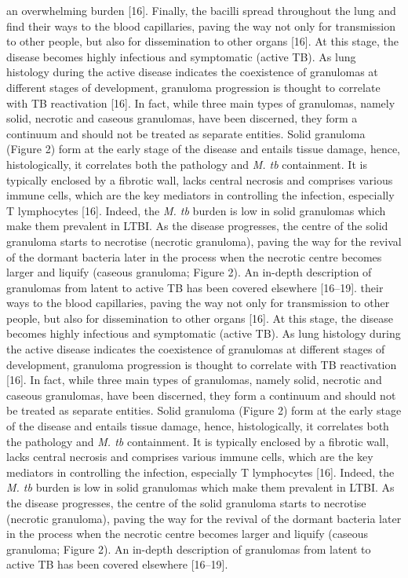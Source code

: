 \documentclass{article}
\begin{document}
an overwhelming burden [16]. Finally, the bacilli spread throughout the lung and find their ways to the blood capillaries, paving the way not only for transmission to other people, but also for dissemination to other organs [16]. At this stage, the disease becomes highly infectious and symptomatic (active TB). As lung histology during the active disease indicates the coexistence of granulomas at different stages of development, granuloma progression is thought to correlate with TB reactivation [16]. In fact, while three main types of granulomas, namely solid, necrotic and caseous granulomas, have been discerned, they form a continuum and should not be treated as separate entities. Solid granuloma (Figure 2) form at the early stage of the disease and entails tissue damage, hence, histologically, it correlates both the pathology and \textit{M. tb} containment. It is typically enclosed by a fibrotic wall, lacks central necrosis and comprises various immune cells, which are the key mediators in controlling the infection, especially T lymphocytes [16]. Indeed, the \textit{M. tb} burden is low in solid granulomas which make them prevalent in LTBI. As the disease progresses, the centre of the solid granuloma starts to necrotise (necrotic granuloma), paving the way for the revival of the dormant bacteria later in the process when the necrotic centre becomes larger and liquify (caseous granuloma; Figure 2). An in-depth description of granulomas from latent to active TB has been covered elsewhere [16–19]. their ways to the blood capillaries, paving the way not only for transmission to other people, but also for dissemination to other organs [16]. At this stage, the disease becomes highly infectious and symptomatic (active TB). As lung histology during the active disease indicates the coexistence of granulomas at different stages of development, granuloma progression is thought to correlate with TB reactivation [16]. In fact, while three main types of granulomas, namely solid, necrotic and caseous granulomas, have been discerned, they form a continuum and should not be treated as separate entities. Solid granuloma (Figure 2) form at the early stage of the disease and entails tissue damage, hence, histologically, it correlates both the pathology and \textit{M. tb} containment. It is typically enclosed by a fibrotic wall, lacks central necrosis and comprises various immune cells, which are the key mediators in controlling the infection, especially T lymphocytes [16]. Indeed, the \textit{M. tb} burden is low in solid granulomas which make them prevalent in LTBI. As the disease progresses, the centre of the solid granuloma starts to necrotise (necrotic granuloma), paving the way for the revival of the dormant bacteria later in the process when the necrotic centre becomes larger and liquify (caseous granuloma; Figure 2). An in-depth description of granulomas from latent to active TB has been covered elsewhere [16–19].
\end{document}
